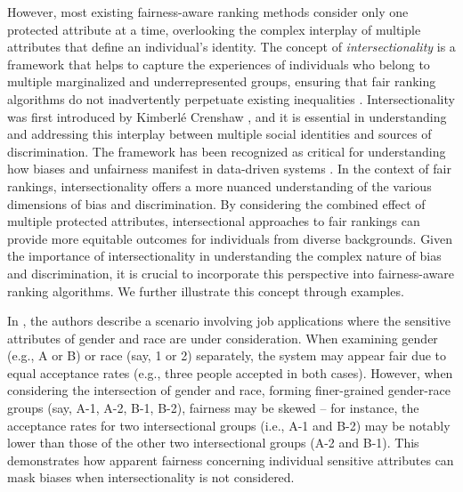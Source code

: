 However, most existing fairness-aware ranking methods consider only one protected attribute at a time, overlooking the complex interplay of multiple attributes that define an individual's identity.
The concept of \emph{intersectionality} is a framework that helps to capture the experiences of individuals who belong to multiple marginalized and underrepresented groups, ensuring that fair ranking algorithms do not inadvertently perpetuate existing inequalities \cite{jagadish2022manyF}. Intersectionality was first introduced by Kimberlé Crenshaw \cite{crenshaw1990mapping}, and it is essential in understanding and addressing this interplay between multiple social identities and sources of discrimination. The framework has been recognized as critical for understanding how biases and unfairness manifest in data-driven systems \cite{zehlike2022fairness1}.
In the context of fair rankings, intersectionality offers a more nuanced understanding of the various dimensions of bias and discrimination. By considering the combined effect of multiple protected attributes, intersectional approaches to fair rankings can provide more equitable outcomes for individuals from diverse backgrounds.
Given the importance of intersectionality in understanding the complex nature of bias and discrimination, it is crucial to incorporate this perspective into fairness-aware ranking algorithms.
We further illustrate this concept through examples.
\begin{example}
In \cite{kang2022infofair}, the authors describe a scenario involving job applications where the sensitive attributes of gender and race are under consideration. When examining gender (e.g., A or B) or race (say, 1 or 2) separately, the system may appear fair due to equal acceptance rates (e.g., three people accepted in both cases). However, when considering the intersection of gender and race, forming finer-grained gender-race groups (say, A-1, A-2, B-1, B-2), fairness may be skewed -- for instance, the acceptance rates for two intersectional groups (i.e., A-1 and B-2) may be notably lower than those of the other two intersectional groups (A-2 and B-1). This demonstrates how apparent fairness concerning individual sensitive attributes can mask biases when intersectionality is not considered.\markfull
\end{example}


